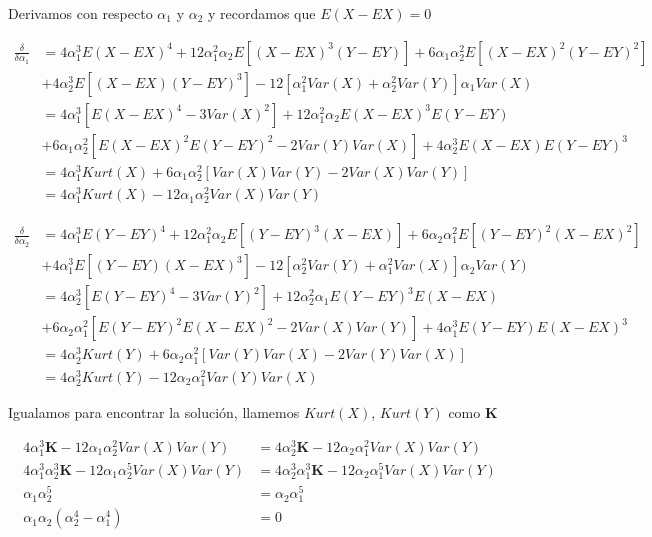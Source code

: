\documentclass{article}
\begin{document}
\begin{enumerate}
Derivamos con respecto $\alpha_1$ y $\alpha_2$ y recordamos que $E(X-EX) = 0$

\begin{align*}
\frac{\delta}{\delta\alpha_1} &= 4\alpha_1^3E(X-EX)^4 + 12\alpha_1^2\alpha_2E[(X-EX)^3(Y-EY)] + 6\alpha_1\alpha_2^2E[(X-EX)^2(Y-EY)^2] \\
&+ 4\alpha_2^3E[(X-EX)(Y-EY)^3] - 12[\alpha_1^2Var(X) + \alpha_2^2Var(Y)]\alpha_1Var(X)\\
&= 4\alpha_1^3[E(X-EX)^4 - 3Var(X)^2] + 12\alpha_1^2\alpha_2E(X-EX)^3E(Y-EY)\\ 
&+ 6\alpha_1\alpha_2^2[E(X-EX)^2E(Y-EY)^2 - 2Var(Y)Var(X)] + 4\alpha_2^3E(X-EX)E(Y-EY)^3\\
&= 4\alpha_1^3Kurt(X) + 6\alpha_1\alpha_2^2[Var(X)Var(Y) - 2Var(X)Var(Y)]\\
&= 4\alpha_1^3Kurt(X) -12 \alpha_1\alpha_2^2Var(X)Var(Y)
\end{align*}

\begin{align*}
\frac{\delta}{\delta\alpha_2} &= 4\alpha_1^3E(Y-EY)^4 + 12\alpha_1^2\alpha_2E[(Y-EY)^3(X-EX)] + 6\alpha_2\alpha_1^2E[(Y-EY)^2(X-EX)^2] \\
&+ 4\alpha_1^3E[(Y-EY)(X-EX)^3] - 12[\alpha_2^2Var(Y) + \alpha_1^2Var(X)]\alpha_2Var(Y)\\
&= 4\alpha_2^3[E(Y-EY)^4 - 3Var(Y)^2] + 12\alpha_2^2\alpha_1E(Y-EY)^3E(X-EX)\\ 
&+ 6\alpha_2\alpha_1^2[E(Y-EY)^2E(X-EX)^2 - 2Var(X)Var(Y)] + 4\alpha_1^3E(Y-EY)E(X-EX)^3\\
&= 4\alpha_2^3Kurt(Y) + 6\alpha_2\alpha_1^2[Var(Y)Var(X) - 2Var(Y)Var(X)]\\
&= 4\alpha_2^3Kurt(Y) -12 \alpha_2\alpha_1^2Var(Y)Var(X)
\end{align*}

Igualamos para encontrar la solución, llamemos $Kurt(X)$, $Kurt(Y)$ como $\boldsymbol{K}$

\begin{align*}
4\alpha_1^3\boldsymbol{K} - 12\alpha_1\alpha_2^2Var(X)Var(Y) &= 4\alpha_2^3\boldsymbol{K} - 12\alpha_2\alpha_1^2Var(X)Var(Y)\\
4\alpha_1^3\alpha_2^3\boldsymbol{K} - 12\alpha_1\alpha_2^5Var(X)Var(Y) &= 4\alpha_2^3\alpha_1^3\boldsymbol{K} - 12\alpha_2\alpha_1^5Var(X)Var(Y)\\
\alpha_1\alpha_2^5 &= \alpha_2\alpha_1^5\\
\alpha_1\alpha_2(\alpha_2^4 - \alpha_1^4) &=0
\end{align*}


\end{enumerate}
\end{document}
